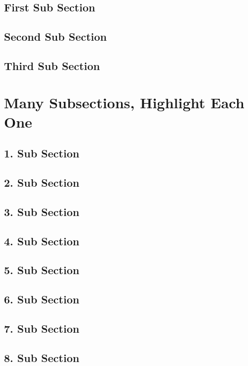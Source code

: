 \documentclass[169,8pt]{beamer}
\begin{document}
    \subsection{First Sub Section}
    \subsection{Second Sub Section}
    \subsection{Third Sub Section}

\section{Many Subsections, Highlight Each One}
    \subsection{1. Sub Section}
    \subsection{2. Sub Section}
    \subsection{3. Sub Section}
    \subsection{4. Sub Section}
    \subsection{5. Sub Section}
    \subsection{6. Sub Section}
    \subsection{7. Sub Section}
    \subsection{8. Sub Section}
\end{document}
